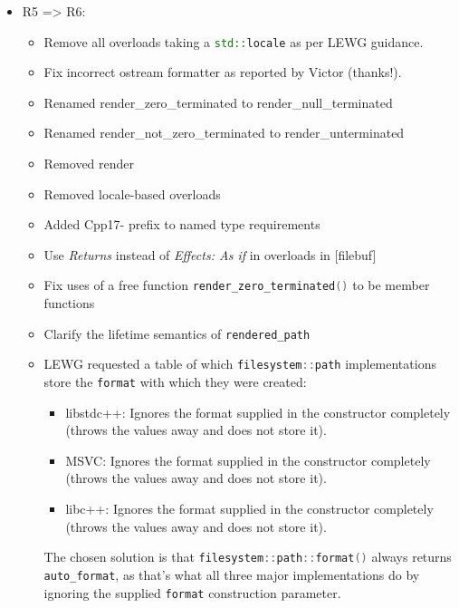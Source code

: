 \documentclass[11pt]{article}
\newcommand{\code}[2][cpp]{\lstinline[language=#1,basicstyle=\small\ttfamily]{#2}}
\begin{document}
\begin{itemize}
    \item R5 => R6:
    \begin{itemize}
    \item Remove all overloads taking a \code{std::locale} as per LEWG guidance.
    \item Fix incorrect ostream formatter as reported by Victor (thanks!). 
    \item Renamed render_zero_terminated to render_null_terminated
    \item Renamed render_not_zero_terminated to render_unterminated
    \item Removed render
    \item Removed locale-based overloads
    \item Added Cpp17- prefix to named type requirements
    \item Use \emph{Returns} instead of \emph{Effects: As if} in overloads in [filebuf]
    \item Fix uses of a free function \code{render_zero_terminated()} to be member functions
    \item Clarify the lifetime semantics of \code{rendered_path}
    \item LEWG requested a table of which \code{filesystem::path} implementations store
    the \code{format} with which they were created:
    \begin{itemize}
      \item libstdc++: Ignores the format supplied in the constructor completely
      (throws the values away and does not store it).\\
      \item MSVC: Ignores the format supplied in the constructor completely
      (throws the values away and does not store it).\\
      \item libc++: Ignores the format supplied in the constructor completely
      (throws the values away and does not store it).\\
    \end{itemize}
    The chosen solution is that \code{filesystem::path::format()} always
    returns \code{auto_format}, as that's what all three major implementations
    do by ignoring the supplied \code{format} construction parameter.
    \end{itemize}


\end{itemize}
\end{document}
